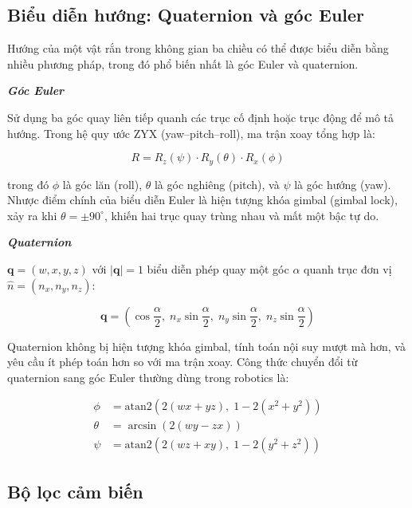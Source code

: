 \subsection{Biểu diễn hướng: Quaternion và góc Euler}

Hướng của một vật rắn trong không gian ba chiều có thể được biểu diễn bằng nhiều phương pháp, trong đó phổ biến nhất là góc Euler và quaternion.

\textbf{\textit{Góc Euler}} 

Sử dụng ba góc quay liên tiếp quanh các trục cố định hoặc trục động để mô tả hướng. Trong hệ quy ước ZYX (yaw--pitch--roll), ma trận xoay tổng hợp là:

\begin{equation}
    R = R_z(\psi) \cdot R_y(\theta) \cdot R_x(\phi)
\end{equation}

trong đó $\phi$ là góc lăn (roll), $\theta$ là góc nghiêng (pitch), và $\psi$ là góc hướng (yaw). Nhược điểm chính của biểu diễn Euler là hiện tượng khóa gimbal (gimbal lock), xảy ra khi $\theta = \pm 90^\circ$, khiến hai trục quay trùng nhau và mất một bậc tự do.

\textbf{\textit{Quaternion}} 

$\mathbf{q} = (w, x, y, z)$ với $|\mathbf{q}| = 1$ biểu diễn phép quay một góc $\alpha$ quanh trục đơn vị $\hat{n} = (n_x, n_y, n_z)$:

\begin{equation}
    \mathbf{q} = \left(\cos\frac{\alpha}{2},\; n_x \sin\frac{\alpha}{2},\; n_y \sin\frac{\alpha}{2},\; n_z \sin\frac{\alpha}{2}\right)
\end{equation}

Quaternion không bị hiện tượng khóa gimbal, tính toán nội suy mượt mà hơn, và yêu cầu ít phép toán hơn so với ma trận xoay. Công thức chuyển đổi từ quaternion sang góc Euler thường dùng trong robotics là:

\begin{align}
    \phi   &= \text{atan2}\left(2(w x + y z),\; 1 - 2(x^2 + y^2)\right) \\
    \theta &= \arcsin\left(2(w y - z x)\right) \\
    \psi   &= \text{atan2}\left(2(w z + x y),\; 1 - 2(y^2 + z^2)\right)
\end{align}

\subsection{Bộ lọc cảm biến}

